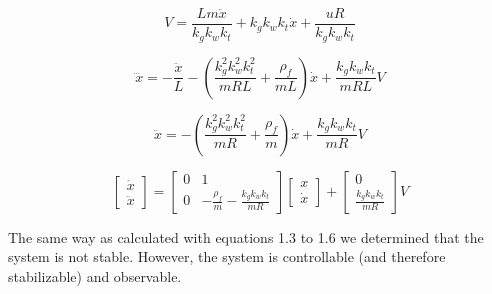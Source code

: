 \documentclass[final]{scrreprt} %
\begin{document}
\begin{equation}
	V = \frac{Lm\ddot{x}}{k_g k_w k_t} + k_g k_w k_t \dot{x} + \frac{uR}{k_g k_w k_t}
	\label{eq:motor}
\end{equation}

\begin{equation}
	\dddot{x} = -\frac{\ddot{x}}{L} -(\frac{k_g^2 k_w^2 k_t^2}{mRL} + \frac{\rho_f}{mL})\dot{x} + \frac{k_g k_w k_t}{mRL}V
	\label{eq:total_system}
\end{equation}

\begin{equation}
	\ddot{x} = -(\frac{k_g^2 k_w^2 k_t^2}{mR} + \frac{\rho_f}{m})\dot{x} + \frac{k_g k_w k_t}{mR}V
	\label{eq:total_system_simple}
\end{equation}

\begin{equation}
	\begin{bmatrix}
		\dot{x} \\
		\ddot{x}
	\end{bmatrix} =
	\begin{bmatrix}
		0 & 1 \\
		0 & -\frac{\rho_f}{m} - \frac{k_g k_w k_t}{mR}
	\end{bmatrix}
	\begin{bmatrix}
		x \\
		\dot{x}
	\end{bmatrix} +
	\begin{bmatrix}
		0 \\
		\frac{k_g k_w k_t}{mR}
	\end{bmatrix}
	V
	\label{eq:total_system_matrix}
\end{equation}

The same way as calculated with equations 1.3 to 1.6 we determined that the system is not stable. However, the system is controllable (and therefore stabilizable) and observable.
\end{document}
